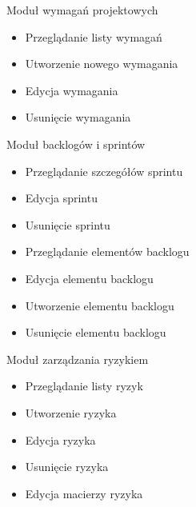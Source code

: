 \item Moduł wymagań projektowych
\begin{itemize}
    \item Przeglądanie listy wymagań
    \item Utworzenie nowego wymagania
    \item Edycja wymagania
    \item Usunięcie wymagania
\end{itemize}

\item Moduł backlogów i sprintów 
\begin{itemize}
    \item Przeglądanie szczegółów sprintu
    \item Edycja sprintu
    \item Usunięcie sprintu
    \item Przeglądanie elementów backlogu
    \item Edycja elementu backlogu
    \item Utworzenie elementu backlogu
    \item Usunięcie elementu backlogu
\end{itemize}

\item Moduł zarządzania ryzykiem
\begin{itemize}
    \item Przeglądanie listy ryzyk
    \item Utworzenie ryzyka
    \item Edycja ryzyka
    \item Usunięcie ryzyka
    \item Edycja macierzy ryzyka
\end{itemize}